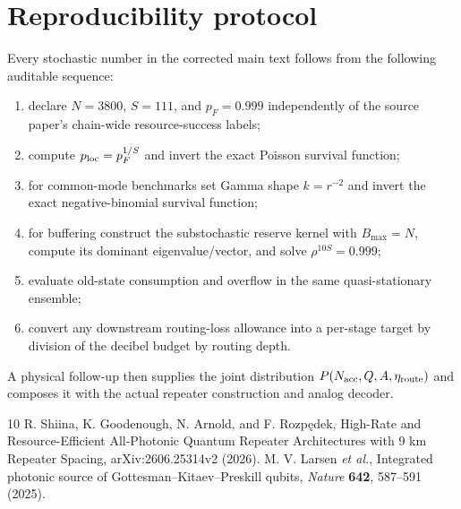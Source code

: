 \documentclass[aps,prx,preprint,superscriptaddress,nofootinbib,longbibliography]{revtex4-2}
\begin{document}
\section{Reproducibility protocol}
Every stochastic number in the corrected main text follows from the following auditable sequence:
\begin{enumerate}
\item declare $N=3800$, $S=111$, and $p_F=0.999$ independently of the source paper's chain-wide resource-success labels;
\item compute $p_{\rm loc}=p_F^{1/S}$ and invert the exact Poisson survival function;
\item for common-mode benchmarks set Gamma shape $k=r^{-2}$ and invert the exact negative-binomial survival function;
\item for buffering construct the substochastic reserve kernel with $B_{\max}=N$, compute its dominant eigenvalue/vector, and solve $\rho^{10S}=0.999$;
\item evaluate old-state consumption and overflow in the same quasi-stationary ensemble;
\item convert any downstream routing-loss allowance into a per-stage target by division of the decibel budget by routing depth.
\end{enumerate}
A physical follow-up then supplies the joint distribution $P(N_{\rm acc},Q,A,\eta_{\rm route})$ and composes it with the actual repeater construction and analog decoder.

\begin{thebibliography}{10}
 R. Shiina, K. Goodenough, N. Arnold, and F. Rozp\k{e}dek, High-Rate and Resource-Efficient All-Photonic Quantum Repeater Architectures with 9 km Repeater Spacing, arXiv:2606.25314v2 (2026).
 M. V. Larsen \emph{et al.}, Integrated photonic source of Gottesman--Kitaev--Preskill qubits, \emph{Nature} \textbf{642}, 587--591 (2025).
\end{thebibliography}
\end{document}
